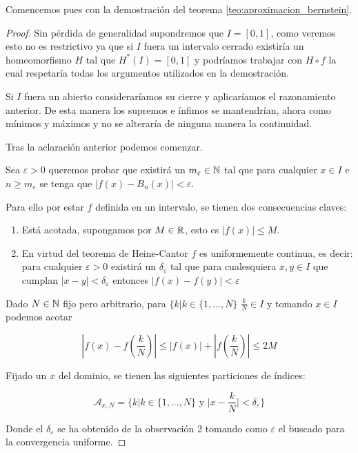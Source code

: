 Comencemos pues con la demostración del teorema \ref{teo:aproximacion_bernstein}.
\begin{proof}
    Sin pérdida de generalidad supondremos que $I=[0,1]$, como veremos esto no es restrictivo ya que 
    si $I$ fuera un intervalo cerrado existiría un homeomorfismo $H$ tal que $H^*(I)=[0,1]$ y podríamos
    trabajar con $H \circ f$ la cual respetaría todas los argumentos utilizados en la demostración. 

    Si $I$ fuera un abierto consideraríamos su cierre y aplicaríamos el razonamiento anterior. 
    De esta manera los supremos e ínfimos se mantendrían, ahora como mínimos y máximos y no se alteraría
    de ninguna manera la continuidad. 

    Tras la aclaración anterior podemos comenzar.
    
    Sea $\varepsilon > 0$ queremos probar que existirá un $m_\varepsilon  \in \mathbb{N}$ tal que para 
    cualquier $x \in I$ e $n \geq m_\varepsilon$  se tenga que 
    $|f(x) - B_n(x)| < \varepsilon$.
    
     Para ello por estar $f$ definida en un intervalo, 
    se tienen dos consecuencias claves: 
    \begin{enumerate}
        \item Está acotada, supongamos por $M \in \mathbb{R}$, esto es $|f(x)| \leq M$.
        \item En virtud del teorema de Heine-Cantor $f$ es uniformemente continua, es decir: para cualquier $\varepsilon >0$ existirá un $\delta_\varepsilon$
        tal que para cualesquiera $x,y \in I$ que cumplan $|x-y| < \delta_\varepsilon$ entonces $|f(x)-f(y)| < \varepsilon$
    \end{enumerate}
    
    
    Dado $N \in  \mathbb{N}$ fijo pero arbitrario, para $\{ k | k \in \{1, ..., N\}$
    $\frac{k}{N} \in I$ y tomando $x \in I$ podemos acotar

    $$\left|f(x)- f\left( \frac{k}{N} \right) \right| \leq |f(x)| + \left|f \left( \frac{k}{N}\right) \right|\leq 2M$$

    
    Fijado un $x$ del dominio, se tienen las siguientes particiones de índices: 
    
    $$\mathcal{A}_{x,N} = \{ k | k \in \{1, ..., N\} \text{ y }  |x- \frac{k}{N}| < \delta_\varepsilon \}$$

    Donde el $\delta_\varepsilon$ se ha obtenido de la observación 2 tomando como $\varepsilon$ el 
    buscado para la convergencia uniforme. 
 

\end{proof}
